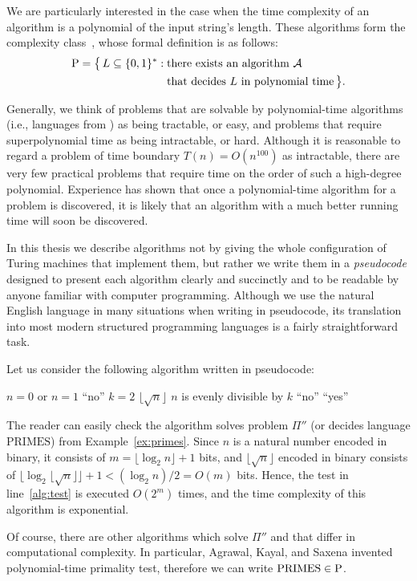 We are particularly interested in the case when the time complexity of an algorithm is a polynomial of the input string's length.
These algorithms form the complexity class~\Pclass, whose formal definition is as follows:
\begin{align*}
    \textnormal{P} = \bigl\{\,L\subseteq\{0,1\}^*:\;&\text{there exists an algorithm $\mathcal{A}$} \\
	& \text{that decides $L$ in polynomial time}\,\bigr\}.
\end{align*}

Generally, we think of problems that are solvable by polynomial-time algorithms (i.e., languages from \Pclass) as being tractable, or easy, and problems that require superpolynomial time as being intractable, or hard.
Although it is reasonable to regard a problem of time boundary $T(n)=O(n^{100})$ as intractable, there are very few practical problems that require time on the order of such a high-degree polynomial.
Experience has shown that once a polynomial-time algorithm for a problem is discovered, it is likely that an algorithm with a much better running time will soon be discovered.

In this thesis we describe algorithms not by giving the whole configuration of Turing machines that implement them, but rather we write them in a \emph{pseudocode} designed to present each algorithm clearly and succinctly and to be readable by anyone familiar with computer programming.
Although we use the natural English language in many situations when writing in pseudocode, its translation into most modern structured programming languages is a fairly straightforward task.

\begin{Example}
	Let us consider the following algorithm written in pseudocode:
	\begin{codebox}
	\li	\If $n=0$ or $n=1$
	\li		\Then \Return ``no''
			\End
	\li	\For $k=2$ \To $\lfloor\!\sqrt{n}\rfloor$
	\li		\Do
				\If $n$ is evenly divisible by $k$ \label{alg:test}
	\li				\Then \Return ``no''
					\End
			\End
	\li	\Return ``yes''
	\end{codebox}
	The reader can easily check the algorithm solves problem $\Pi''$ (or decides language $\text{PRIMES}$) from Example~\ref{ex:primes}.
	Since $n$ is a natural number encoded in binary, it consists of $m=\lfloor\log_2n\rfloor+1$ bits, and $\lfloor\!\sqrt{n}\rfloor$ encoded in binary consists of $\lfloor\log_2\lfloor\!\sqrt{n}\rfloor\rfloor+1<(\log_2n)/2=O(m)$ bits.
	Hence, the test in line~\ref{alg:test} is executed $O(2^m)$ times, and the time complexity of this algorithm is exponential.
	
	Of course, there are other algorithms which solve $\Pi''$ and that differ in computational complexity.
	In particular, Agrawal, Kayal, and Saxena \cite{agrawal} invented polynomial-time primality test, therefore we can write $\text{PRIMES}\in\textnormal{P}$.
\end{Example}

